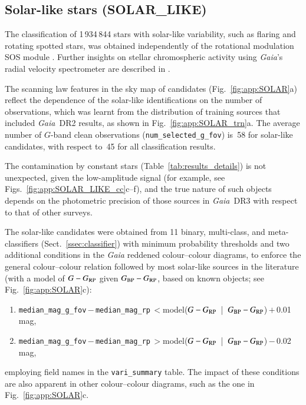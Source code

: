 \documentclass[longauth]{aa}
\def\gaia{\textit{Gaia}\xspace}
\def\gdr3{\textit{Gaia}~DR3\xspace}
\def\g{$G$\xspace}
\def\bprp{\mbox{$G_{\rm BP}-G_{\rm RP}$}\xspace}
\def\grp{\mbox{$G-G_{\rm RP}$}\xspace}
\begin{document}

\subsection{Solar-like stars (SOLAR\_LIKE)\label{ssec:solar_like}}

The classification of 1\,934\,844 stars with solar-like variability, such as flaring and rotating spotted stars, was obtained independently of the rotational modulation SOS module \citep{DR3-DPACP-173}.
Further insights on stellar chromospheric activity using \gaia's radial velocity spectrometer are described in \citet{DR3-DPACP-175}.

The scanning law features in the sky map of candidates (Fig.~\ref{fig:app:SOLAR}a) reflect the dependence of the solar-like identifications on the number of observations, which was learnt from the distribution of training sources that included \gaia~DR2 results, as shown in Fig.~\ref{fig:app:SOLAR_trn}a. The average number of \g-band clean observations (\texttt{num\_selected\_g\_fov}) is~58 for solar-like candidates, with respect to~45 for all classification results.

The contamination by constant stars (Table~\ref{tab:results_details}) is not unexpected, given the low-amplitude signal (for example, see Figs.~\ref{fig:app:SOLAR_LIKE_cc}c--f), and the true nature of such objects depends on the photometric precision of those sources in \gdr3 with respect to that of other surveys.

The solar-like candidates were obtained from 11 binary, multi-class, and meta-classifiers (Sect.~\ref{ssec:classifier}) with minimum probability thresholds and two additional conditions in the \gaia reddened colour--colour diagrams, to enforce the general colour--colour relation followed by most solar-like sources in the literature (with a model of \grp given \bprp, based on known objects; see Fig.~\ref{fig:app:SOLAR}c): 
\begin{enumerate}
  \item \texttt{median\_mag\_g\_fov}\,$-$\,\texttt{median\_mag\_rp}\,$<$\break model(\grp~|~\bprp)\,$+$\,0.01\,mag,
  \item \texttt{median\_mag\_g\_fov}\,$-$\,\texttt{median\_mag\_rp}\,$>$\break model(\grp~|~\bprp)\,$-$\,0.02\,mag,
\end{enumerate}
employing field names in the \texttt{vari\_summary} table.
The impact of these conditions are also apparent in other colour--colour diagrams, such as the one in Fig.~\ref{fig:app:SOLAR}c.
\end{document}
